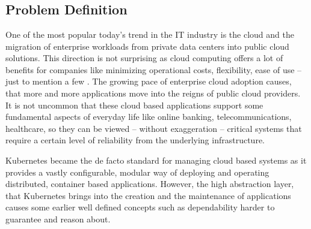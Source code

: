 \chapter{\bevezetes}

\section{Problem Definition}

One of the most popular today's trend in the IT industry is the cloud and the migration of enterprise workloads from private data centers into public cloud solutions. This direction is not surprising as cloud computing offers a lot of benefits for companies like minimizing operational costs, flexibility, ease of use -- just to mention a few \cite{CLoudComputingStatistics}. The growing pace of enterprise cloud adoption causes, that more and more applications move into the reigns of public cloud providers. It is not uncommon that these cloud based applications support some fundamental aspects of everyday life like online banking, telecommunications, healthcare, so they can be viewed -- without exaggeration -- critical systems that require a certain level of reliability from the underlying infrastructure.

Kubernetes became the de facto standard for managing cloud based systems as it provides a vastly configurable, modular way of deploying and operating distributed, container based applications. However, the high abstraction layer, that Kubernetes brings into the creation and the maintenance of applications causes some earlier well defined concepts such as dependability harder to guarantee and reason about.

